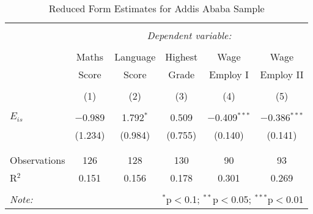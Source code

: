

\begin{table}[!htbp] \centering 
  \caption{Reduced Form Estimates for Addis Ababa Sample} 
  \label{} 
\begin{tabular}{@{\extracolsep{5pt}}lccccc} 
\\[-1.8ex]\hline 
\hline \\[-1.8ex] 
 & \multicolumn{5}{c}{\textit{Dependent variable:}} \\ 
\cline{2-6} 
\\[-1.8ex] & Maths & Language & Highest & Wage & Wage \\ 
 & Score & Score & Grade & Employ I & Employ II \\
\\[-1.8ex] & (1) & (2) & (3) & (4) & (5)\\ 
\hline \\[-1.8ex] 
 $E_{is}$ & $-$0.989 & 1.792$^{*}$ & 0.509 & $-$0.409$^{***}$ & $-$0.386$^{***}$ \\ 
  & (1.234) & (0.984) & (0.755) & (0.140) & (0.141) \\ 
  & & & & & \\ 
\hline \\[-1.8ex] 
Observations & 126 & 128 & 130 & 90 & 93 \\ 
R$^{2}$ & 0.151 & 0.156 & 0.178 & 0.301 & 0.269 \\ 
\hline 
\hline \\[-1.8ex] 
\textit{Note:}  & \multicolumn{5}{r}{$^{*}$p$<$0.1; $^{**}$p$<$0.05; $^{***}$p$<$0.01} \\ 
\end{tabular} 
\end{table} 



